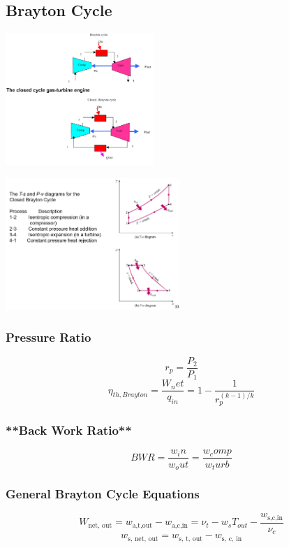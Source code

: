 \documentclass[10pt,landscape]{article}
\newenvironment{Figure}
     {\par\medskip\noindent\minipage{\linewidth}}
     {\endminipage\par\medskip}
\begin{document}
\begin{multicols}{3}
\subsection{Brayton Cycle}
\begin{Figure}
    \centering
    \includegraphics[width=\linewidth, height=5cm]{ClosedCycle_GasTurbineEngine.png}
\end{Figure}
\begin{Figure}
    \centering
    \includegraphics[width=\linewidth, height=5cm]{BraytonCycleClosed_PVTS.png}
\end{Figure}
\subsubsection{Pressure Ratio}
\begin{equation}
    r_p=\frac{P_2}{P_1}
\end{equation}
\begin{equation}
    \eta_{th,Brayton}=\frac{W_net}{q_{in}}=1-\frac{1}{r_p^{(k-1)/k}}
\end{equation}
\subsubsection{**Back Work Ratio**}
\begin{equation}
    BWR=\frac{w_in}{w_out}=\frac{w_comp}{w_turb}
\end{equation}
\subsubsection{General Brayton Cycle Equations}
\begin{equation}
    W_{\text{net, out}}=w_{\text{a,t,out}}-w_{\text{a,c,in}}=\nu_t-w_sT_{out}-\frac{w_{\text{s,c,in}}}{\nu_c}
\end{equation}
\begin{equation}
    w_{\text{s, net, out}}=w_{\text{s, t, out}}-w_{\text{s, c, in}}
\end{equation}


\end{multicols}
\end{document}
